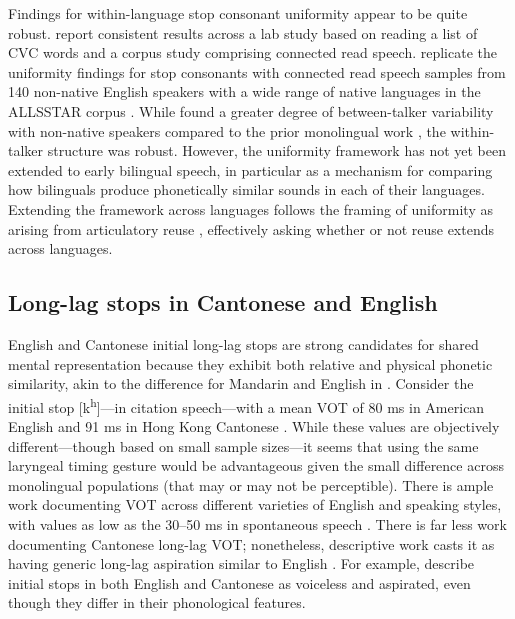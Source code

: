 Findings for within-language stop consonant uniformity appear to be quite robust. \citet{chodroff_2017_structure} report consistent results across a lab study based on reading a list of CVC words and a corpus study comprising connected read speech. \citet{chodroff_2019_l2} replicate the uniformity findings for stop consonants with connected read speech samples from 140 non-native English speakers with a wide range of native languages in the ALLSSTAR corpus \citep{bradlow_2011_allsstar}. While \citet{chodroff_2019_l2} found a greater degree of between-talker variability with non-native speakers compared to the prior monolingual work \citep{chodroff_2017_structure}, the within-talker structure was robust. However, the uniformity framework has not yet been extended to early bilingual speech, in particular as a mechanism for comparing how bilinguals produce phonetically similar sounds in each of their languages. Extending the framework across languages follows the framing of uniformity as arising from articulatory reuse \citep{faytak_2018_uniformity}, effectively asking whether or not reuse extends across languages. 

\subsection{Long-lag stops in Cantonese and English}\label{ch4:sec:rqs}

English and Cantonese initial long-lag stops are strong candidates for shared mental representation because they exhibit both relative and physical phonetic similarity, akin to the difference for Mandarin and English in \citet{yang_2019_vot}. Consider the initial stop [k\textsuperscript{h}]---in citation speech---with a mean VOT of 80 ms in American English \citep{lisker_1964_vot} and 91 ms in Hong Kong Cantonese \citep{clumeck_1981_cantonese}. While these values are objectively different---though based on small sample sizes---it seems that using the same laryngeal timing gesture would be advantageous given the small difference across monolingual populations (that may or may not be perceptible). There is ample work documenting VOT across different varieties of English and speaking styles, with values as low as the 30--50 ms in spontaneous speech \citep{stuartsmith_2015_private}. There is far less work documenting Cantonese long-lag VOT; nonetheless, descriptive work casts it as having generic long-lag aspiration similar to English \citep{matthews_2013_cantonese, bauer_1997_cantonese, chan_2000_english, mielke_2018_voice}. For example, \citet{matthews_2013_cantonese} describe initial stops in both English and Cantonese as voiceless and aspirated, even though they differ in their phonological features. 
 
